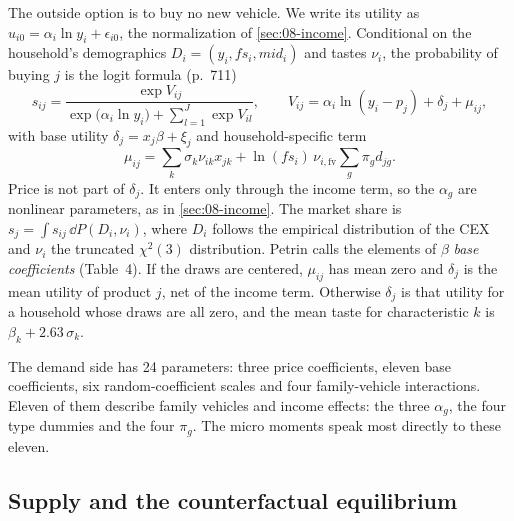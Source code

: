 The outside option is to buy no new vehicle. We write its utility as $u_{i0} = \alpha_i\ln y_i + \epsilon_{i0}$, the
normalization of \cref{sec:08-income}. Conditional on the household's demographics $D_i = (y_i, fs_i, \mathit{mid}_i)$
and tastes $\nu_i$, the probability of buying $j$ is the logit formula (p.~711)
\begin{equation}\label{eq:10-petrin-sij}
  s_{ij} = \frac{\exp V_{ij}}{\exp\bigl(\alpha_i \ln y_i\bigr) + \sum_{l=1}^{J} \exp V_{il}} ,\qquad
  V_{ij} = \alpha_i\ln(y_i - p_j) + \delta_j + \mu_{ij},
\end{equation}
with base utility $\delta_j = x_j\beta + \xi_j$ and household-specific term
\begin{equation*}
  \mu_{ij} = \sum_k\sigma_k\nu_{ik}x_{jk} + \ln(fs_i)\,\nu_{i,\mathrm{fv}}\sum_g \pi_g d_{jg} .
\end{equation*}
Price is not part of $\delta_j$. It enters only through the income
term, so the $\alpha_g$ are nonlinear parameters, as in \cref{sec:08-income}. The market share is $s_j = \int s_{ij}\,
\dd P(D_i, \nu_i)$, where $D_i$ follows the empirical distribution of the CEX and $\nu_i$ the truncated $\chi^2(3)$
distribution. Petrin calls the elements of $\beta$ \emph{base coefficients} (Table~4). If the draws are centered,
$\mu_{ij}$ has mean zero and $\delta_j$ is the mean utility of product $j$, net of the income term. Otherwise
$\delta_j$ is that utility for a household whose draws are all zero, and the mean taste for characteristic $k$ is
$\beta_k + 2.63\,\sigma_k$.

The demand side has 24 parameters: three price coefficients, eleven base coefficients, six random-coefficient scales
and four family-vehicle interactions. Eleven of them describe family vehicles and income effects: the three
$\alpha_g$, the four type dummies and the four $\pi_g$. The micro moments speak most directly to these eleven.

\subsection{Supply and the counterfactual equilibrium}\label{sec:10-petrin-supply}

